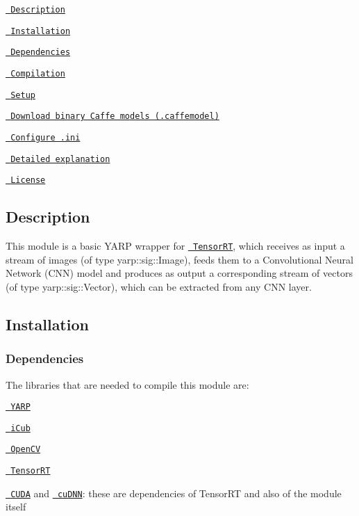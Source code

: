 
\begin{DoxyItemize}
\item \href{\#description}{\texttt{ Description}}
\item \href{\#installation}{\texttt{ Installation}}
\begin{DoxyItemize}
\item \href{\#dependencies}{\texttt{ Dependencies}}
\item \href{\#compilation}{\texttt{ Compilation}}
\end{DoxyItemize}
\item \href{\#setup}{\texttt{ Setup}}
\begin{DoxyItemize}
\item \href{\#download-binary-caffe-models-caffemodel}{\texttt{ Download binary Caffe models (.caffemodel)}}
\item \href{\#configure-ini}{\texttt{ Configure .ini}}
\end{DoxyItemize}
\item \href{\#detailed-explanation}{\texttt{ Detailed explanation}}
\item \href{\#license}{\texttt{ License}}
\end{DoxyItemize}

\subsection*{Description}

This module is a basic Y\+A\+RP wrapper for \href{https://developer.nvidia.com/tensorrt}{\texttt{ Tensor\+RT}}, which receives as input a stream of images (of type {\ttfamily yarp\+::sig\+::\+Image}), feeds them to a Convolutional Neural Network (C\+NN) model and produces as output a corresponding stream of vectors (of type {\ttfamily yarp\+::sig\+::\+Vector}), which can be extracted from any C\+NN layer.

\subsection*{Installation}

\subsubsection*{Dependencies}

The libraries that are needed to compile this module are\+:


\begin{DoxyItemize}
\item \href{https://github.com/robotology/yarp}{\texttt{ Y\+A\+RP}}
\item \href{https://github.com/robotology/icub-main}{\texttt{ i\+Cub}}
\item \href{http://opencv.org/releases.html}{\texttt{ Open\+CV}}
\item \href{https://developer.nvidia.com/tensorrt}{\texttt{ Tensor\+RT}}
\item \href{https://developer.nvidia.com/cuda-zone}{\texttt{ C\+U\+DA}} and \href{https://developer.nvidia.com/cudnn}{\texttt{ cu\+D\+NN}}\+: these are dependencies of Tensor\+RT and also of the module itself
\end{DoxyItemize}

